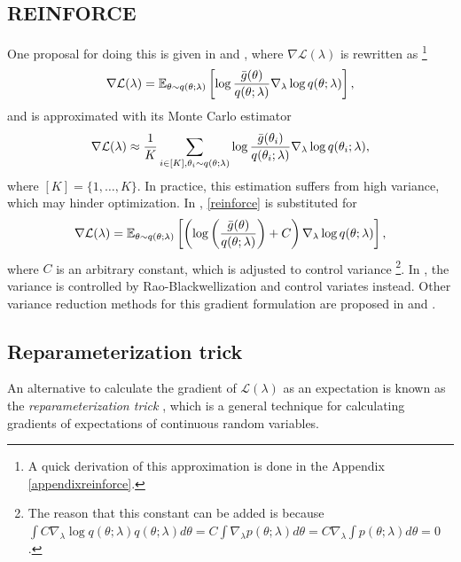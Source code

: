 \subsection{REINFORCE}
One proposal for doing this is given in \cite{Wingate_2013} and \cite{Ranganath_2014}, where $\nabla \mathcal{L}(\lambda)$ is rewritten as \footnote{A quick derivation of this approximation is done in the Appendix \ref{appendixreinforce}.}
\begin{equation}\label{reinforce}
\nabla \mathcal{L}(\lambda) = {\mathbb E}_{\theta \sim q(\theta;\lambda)} \left[ \log \frac{{\bar{g}}(\theta)}{q(\theta;\lambda)} \nabla_{\lambda} \log q(\theta;\lambda) \right], 
\end{equation}
and is approximated with its Monte Carlo estimator 
\begin{equation}\label{reinforcemc}
\nabla \mathcal{L}(\lambda) \approx \frac{1}{K} \sum_{i \in [K], \theta_i \sim q(\theta;\lambda)} \log \frac{{\bar{g}}(\theta_i)}{q(\theta_i;\lambda)} \nabla_{\lambda} \log q(\theta_i;\lambda),
\end{equation}
where $[K] = \{1,\ldots,K\}$. In practice, this estimation suffers from high variance, which may hinder optimization. In \cite{Wingate_2013}, \eqref{reinforce} is substituted for 
\begin{equation}
\nabla \mathcal{L}(\lambda) = {\mathbb E}_{\theta \sim q(\theta;\lambda)} \left[ \left( \log \left( \frac{{\bar{g}}(\theta)}{q(\theta;\lambda)}\right) + C\right) \nabla_{\lambda} \log q(\theta;\lambda) \right], 
\end{equation}
where $C$ is an arbitrary constant, which is adjusted to control variance \footnote{The reason that this constant can be added is because $\int C \nabla_\lambda \log q(\theta;\lambda) q(\theta;\lambda) d\theta = C \int \nabla_\lambda p(\theta;\lambda) d\theta = C \nabla_\lambda \int p(\theta;\lambda) d\theta = 0$.}. In \cite{Ranganath_2014}, the variance is controlled by Rao-Blackwellization and control variates instead. Other variance reduction methods for this gradient formulation are proposed in \cite{Titsias_2015} and \cite{Ruiz_2016}.

\subsection{Reparameterization trick}\label{reparameterizationsection}
An alternative to calculate the gradient of $\mathcal{L}(\lambda)$ as an expectation is known as the \textit{reparameterization trick} \cite{Kingma_2013}, which is a general technique for calculating gradients of expectations of continuous random variables.

